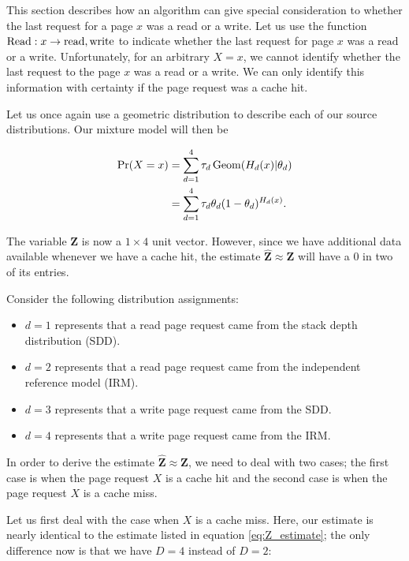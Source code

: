   This section describes how an algorithm can give special consideration to whether
  the last request for a page $x$ was a read or a write. Let us use the function
  $\operatorname*{\operatorname{Read}} : x \to {\mbox{read}, \mbox{write}}$ to indicate whether the last
  request for page $x$ was a $\mbox{read}$ or a $\mbox{write}$. Unfortunately,
  for an arbitrary $X = x$, we cannot identify whether the last request to the
  page $x$ was a read or a write. We can only identify this information with
  certainty if the page request was a cache hit.

  Let us once again use a geometric distribution to describe each of our source
  distributions. Our mixture model will then be

  \begin{align}
    \Pr(X = x) &= \sum_{d=1}^{4} \tau_d \operatorname*{\operatorname{Geom}}(H_d(x) | \theta_d) \\
               &= \sum_{d=1}^{4} \tau_d \theta_d (1 - \theta_d)^{H_d(x)} .
  \end{align}

  The variable $\bm{Z}$ is now a $1 \times 4$ unit vector. However, since we
  have additional data available whenever we have a cache hit, the estimate
  $\hat{\bm{Z}} \approx \bm{Z}$ will have a $0$ in two of its entries.

  Consider the following distribution assignments:
  \begin{itemize}
    \item
    $d = 1$ represents that a read page request came from the stack depth
    distribution (SDD).

    \item
    $d = 2$ represents that a read page request came from the independent
    reference model (IRM).

    \item
    $d = 3$ represents that a write page request came from the SDD.

    \item
    $d = 4$ represents that a write page request came from the IRM.
  \end{itemize}

  In order to derive the estimate $\hat{\bm{Z}} \approx \bm{Z}$, we need to deal
  with two cases; the first case is when the page request $X$ is a cache hit and
  the second case is when the page request $X$ is a cache miss.

  Let us first deal with the case when $X$ is a cache miss. Here, our estimate
  is nearly identical to the estimate listed in equation \ref{eq:Z_estimate};
  the only difference now is that we have $D = 4$ instead of $D = 2$:

